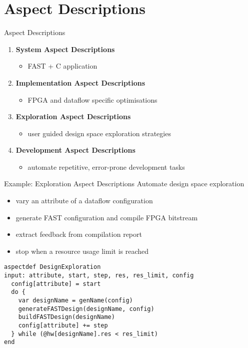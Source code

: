 \section{Aspect Descriptions}
\begin{frame}{Aspect Descriptions}
  \begin{enumerate}
    \setlength{\itemsep}{15pt}
  \item \textbf{System Aspect Descriptions}
    \begin{itemize}
    \item FAST + C application
    \end{itemize}
  \item \textbf{Implementation Aspect Descriptions}
    \begin{itemize}
    \item FPGA and dataflow specific optimisations
    \end{itemize}
  \item \textbf{Exploration Aspect Descriptions}
    \begin{itemize}
    \item user guided design space exploration strategies
    \end{itemize}
  \item \textbf{Development Aspect Descriptions}
    \begin{itemize}
    \item automate repetitive, error-prone development tasks
    \end{itemize}
  \end{enumerate}
\end{frame}

\begin{frame}[fragile]{Example: Exploration Aspect Descriptions}
  Automate design space exploration
  \begin{itemize}
  \item vary an attribute of a dataflow configuration
  \item generate FAST configuration and compile FPGA bitstream
  \item extract feedback from compilation report
  \item stop when a resource usage limit is reached
  \end{itemize}
  \begin{lstlisting}[label=lst:label, style=lara]
aspectdef DesignExploration
input: attribute, start, step, res, res_limit, config
  config[attribute] = start
  do {
    var designName = genName(config)
    generateFASTDesign(designName, config)
    buildFASTDesign(designName)
    config[attribute] += step
  } while (@hw[designName].res < res_limit)
end
  \end{lstlisting}
\end{frame}
